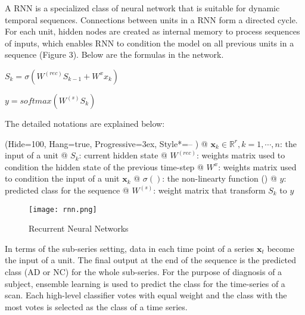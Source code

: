 A RNN is a specialized class of neural network that is suitable for dynamic temporal sequences. Connections between units in a RNN form a directed cycle. For each unit, hidden nodes are created as internal memory to process sequences of inputs, which enables RNN to condition the model on all previous units in a sequence (Figure 3). Below are the formulas in the network.

\begin{center}
$S_k = \sigma(W^{(rec)}S_{k-1} + W^{x}x_k )$
\end{center} 
\begin{center}
$y = softmax(W^{(s)}S_k)$
\end{center}

The detailed notations are explained below:
\begin{easylist}
\ListProperties(Hide=100, Hang=true, Progressive=3ex, Style*=-- )
@ $ \textbf{x}_k \in  \mathbb{R}^{r}, k=1, \cdots , n$: the input of a unit
@ $S_k $: current hidden state
@ $W^{(rec)}$: weights matrix used to condition the hidden state of the previous time-step 
@ $W^{x}$: weights matrix used to condition the input of a unit $ \textbf{x}_k$
@ $\sigma()$: the non-linearty function ()
@ $y$: predicted class for the sequence
@ $W^{(s)}$: weight matrix that transform $S_k$ to $y$
\end{easylist}

\begin{figure}[!htbp]
    \centering
    \texttt{[image: rnn.png]}
    \caption{Recurrent Neural Networks}
    \label{fig:awesome_image}
\end{figure}

In terms of the sub-series setting, data in each time point of a series $\textbf{x}_t$ become the input of a unit. The final output at the end of the sequence is the predicted class (AD or NC) for the whole sub-series. For the purpose of diagnosis of a subject, ensemble learning is used to predict the class for the time-series of a scan. Each high-level classifier votes with equal weight and the class with the most votes is selected as the class of a time series.
